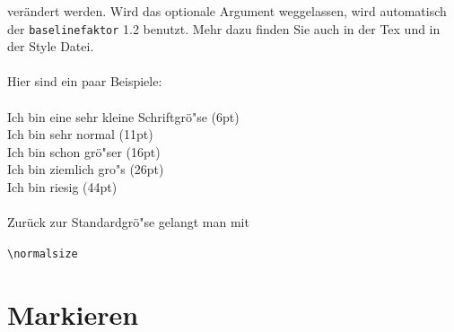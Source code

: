 \documentclass[11pt, rgb]{scrreprt}
\begin{document}
\noindent verändert werden. Wird das optionale Argument weggelassen, wird automatisch der \texttt{baselinefaktor} 1.2 benutzt. Mehr dazu finden Sie auch in der Tex und in der Style Datei.\\
\\
Hier sind ein paar Beispiele:\\
\\
 Ich bin eine sehr kleine Schriftgrö"se (6pt)\\
 Ich bin sehr normal (11pt)\\
 Ich bin schon grö"ser (16pt)\\
 Ich bin ziemlich gro"s (26pt)\\
 Ich bin riesig (44pt)%
%
\normalsize\\
\\
Zurück zur Standardgrö"se gelangt man mit

\begin{center}
\texttt{\textbackslash normalsize}
\end{center}

\newpage



\section{Markieren}

\end{document}
